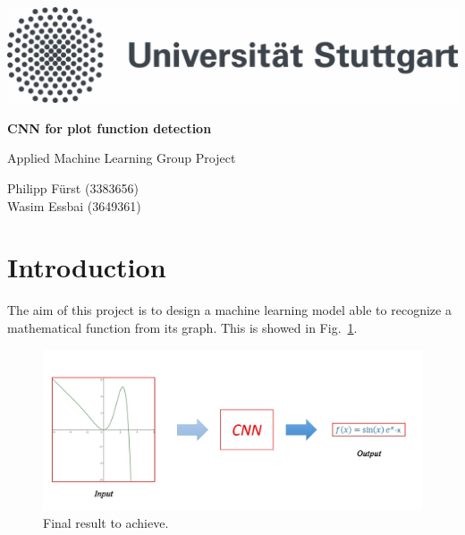 \documentclass[11pt,a4paper]{scrartcl}
\newcommand{\Fig}[0]{Fig.}
\begin{document}
	\lstset{language=tex}
	
	\begin{titlepage}
		 \center
		 \includegraphics[scale=0.2]{ImageFiles/unistuttgart_logo_de} 
		 \vspace*{2cm} 
		
		\begin{center} \large 
		     
			 \vspace*{2cm}
			 {\huge \textbf{CNN for plot function detection}}
			 \vspace*{2.5cm}
			
			 Applied Machine Learning Group Project
			 \vspace*{2.5cm}
			
			 Philipp Fürst (3383656)\\
			 Wasim Essbai (3649361)
			 \vspace*{1cm}
		\end{center}
	\end{titlepage}

	\tableofcontents
	\listoffigures
	\pagebreak
	
  	\pagestyle{plain}
  
	\section{Introduction}
	The aim of this project is to design a machine learning model able to recognize a mathematical function from its graph. This is showed in \Fig~\ref{fig:GeneralIdea}.
	
	\begin{figure}[h!]
		\centering
		\includegraphics[width=0.7\linewidth]{./ImageFiles/general_idea}
		\caption{Final result to achieve.}
		\label{fig:GeneralIdea}
	\end{figure}
\end{document}
